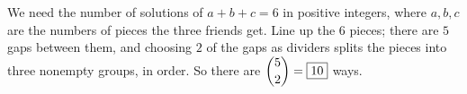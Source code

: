 We need the number of solutions of $a+b+c=6$ in positive integers, where $a,b,c$ are the numbers of pieces the three friends get. Line up the $6$ pieces; there are $5$ gaps between them, and choosing $2$ of the gaps as dividers splits the pieces into three nonempty groups, in order. So there are $\dbinom52=\boxed{10}$ ways.
